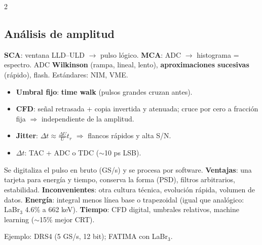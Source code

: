 \documentclass[10pt,a4paper]{article}
\newcommand{\imp}[1]{\textbf{\color{BrickRed}#1}}
\begin{document}
\begin{multicols}{2}
\subsection{Análisis de amplitud}
\textbf{SCA}: ventana LLD--ULD $\to$ pulso lógico. \textbf{MCA}: ADC $\to$ histograma = espectro. ADC \textbf{Wilkinson} (rampa, lineal, lento), \textbf{aproximaciones sucesivas} (rápido), flash. Estándares: NIM, VME.
\columnbreak
\begin{clave}[Timing]
\begin{itemize}
\item \textbf{Umbral fijo}: \imp{time walk} (pulsos grandes cruzan antes).
\item \imp{CFD}: señal retrasada + copia invertida y atenuada; cruce por cero a fracción fija $\Rightarrow$ independiente de la amplitud.
\item \textbf{Jitter}: $\displaystyle\Delta t\approx\frac{\Delta U}{U}t_r$ $\Rightarrow$ flancos rápidos y alta S/N.
\item $\Delta t$: TAC + ADC o TDC ($\sim$10 ps LSB).
\end{itemize}
\end{clave}
\begin{clave}
Se digitaliza el pulso en bruto (GS/s) y se procesa por software.
\textbf{Ventajas}: una tarjeta para energía y tiempo, conserva la forma (PSD), filtros arbitrarios, estabilidad.
\textbf{Inconvenientes}: otra cultura técnica, evolución rápida, volumen de datos.
\textbf{Energía}: integral menos línea base o trapezoidal (igual que analógico: LaBr$_3$ 4.6\% a 662 keV).
\textbf{Tiempo}: CFD digital, umbrales relativos, machine learning ($\sim$15\% mejor CRT).
\end{clave}
Ejemplo: DRS4 (5 GS/s, 12 bit); FATIMA con LaBr$_3$.
\end{multicols}
\newpage

\setcounter{section}{8}
\end{document}
